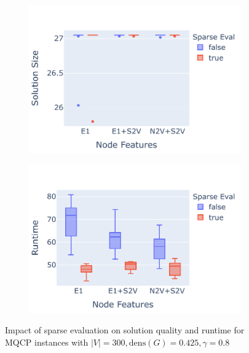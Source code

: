 \documentclass[draft,final]{vutinfth} %
\begin{document}
\begin{figure}
    \centering
    \begin{subfigure}{0.49\textwidth}
        \centering
        \includegraphics[width=\textwidth]{graphics/sparse-eval-2-size.pdf}
    \end{subfigure}
    \begin{subfigure}{0.49\textwidth}
        \centering
        \includegraphics[width=\textwidth]{graphics/sparse-eval-2-runtime.pdf}
    \end{subfigure}
    \caption{Impact of sparse evaluation on solution quality and runtime for MQCP instances with $|V| = 300, \mathrm{dens}(G)=0.425, \gamma=0.8$}
    \label{fig:sparse-evaluation-2}
\end{figure}

\end{document}
